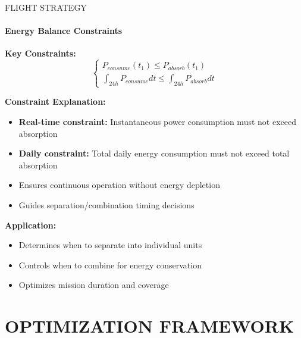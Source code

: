 \documentclass{beamer}
\begin{document}
\begin{frame}{FLIGHT STRATEGY}
    \framesubtitle{Energy Balance Constraints}
    
    \textbf{Key Constraints:}
    \begin{equation*}
        \begin{cases}
            P_{consume}(t_1) \leq P_{absorb}(t_1) \\
            \int_{24h} P_{consume}dt \leq \int_{24h} P_{absorb}dt
        \end{cases}
    \end{equation*}
    
    \vspace{0.5cm}
    \textbf{Constraint Explanation:}
    \begin{itemize}
        \item \textbf{Real-time constraint:} Instantaneous power consumption must not exceed absorption
        \item \textbf{Daily constraint:} Total daily energy consumption must not exceed total absorption
        \item Ensures continuous operation without energy depletion
        \item Guides separation/combination timing decisions
    \end{itemize}
    
    \vspace{0.3cm}
    \textbf{Application:}
    \begin{itemize}
        \item Determines when to separate into individual units
        \item Controls when to combine for energy conservation
        \item Optimizes mission duration and coverage
    \end{itemize}
\end{frame}

\section{OPTIMIZATION FRAMEWORK}
\end{document}
